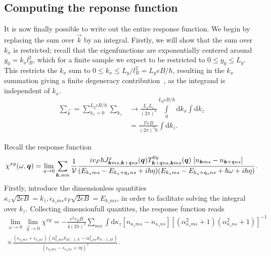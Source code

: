 \subsection{Computing the reponse function}
\label{sec:response_notilt}
It is now finally possible to write out the entire response function.
We begin by replacing the sum over \( \vec{k} \) by an integral.
Firstly, we will show that the sum over $k_x$ is restricted;
recall that the eigenfunctions are exponentially centered around $y_0 = k_x l_B^2$, which for a finite sample we expect to be restricted to $0 \leq y_0 \leq L_y$.
This restricts the $k_x$ sum to $0 \leq k_x \leq L_y / l_B^2 = L_ye B /\hbar $, resulting in the $k_x$ summation giving a finite degeneracy contribution~\cites[Ch.~1.4.1]{tongGaugeTheoryLecture}{linderIntermediateQuantumMechanics2017}, as the integrand is independent of \( k_x \).
\begin{align}
  \sum\limits_{\vec{k}}^{} = \sum\limits_{k_x = 0}^{L_y eB / \hbar } \sum\limits_{k_z}^{} &\to 
                                                                                            \frac{L_xL_z}{(2\pi )^2} \int\limits_0^{L_y e B /\hbar } \mathrm{d}k_x \int\mathrm{d}k_z \\
  &= \frac{\mathcal{V} e B}{(2 \pi)^2 \hbar } \int \mathrm{d}k_{z}.
\end{align}

Recall the response function
\begin{equation}
  \chi ^{xy} (\omega , \bm{q}) =
  \lim_{\eta \to 0}
  \sum\limits_{\bm{k}, mn}^{}
  \frac{1}{\mathcal{V}}
  \frac{
    i v_F \hbar J^x_{\bm{k} m s, \bm{k}+\mathfrak{q} n s}(\bm{q})
    T^{0y}_{\bm{k}+\mathfrak{q} ns, \bm{k}ms}(\bm{q})
    \;
    [n_{\bm{k} m s}- n_{\bm{k}+\mathfrak{q} ns }]
  }{
    (E_{k_z m s} - E_{k_z + \mathfrak{q}_z ns} + i \hbar  \eta )
    (E_{k_z m s} - E_{k_z + \mathfrak{q}_z ns} + \hbar \omega + i \hbar  \eta )
  }
  .
\end{equation}
Firstly, introduce the dimensionless quantities \( \kappa_z \sqrt{2 eB} = k_z, \epsilon_{k_z m s} v_F \sqrt{2 e B} = E_{k_z m s}  \), in order to facilitate solving the integral over \( k_z \).
Collecting dimensionfull quantites, the response function reads
\begin{multline}
  \label{eq:90}
\lim_{\omega \to 0} \lim_{\vec{q} \to 0} \chi^{xy} =
  -\frac{e^2 v_F B }{4 (2 \pi)^2}
  \sum\limits_{m n}^{}
  \int \mathrm{d} \kappa_z
  [n_{\kappa_z m s} - n_{\kappa_z n s}]
  [(\alpha_{\kappa_z m s}^2 + 1) (\alpha_{\kappa_z n s}^2 + 1)]^{-1}\\
  \times
  \frac{
    (\epsilon_{\kappa_z m s} + \epsilon_{\kappa_z n s})
    (\alpha_{\kappa_z m s}^2 \delta_{M-1, N} - \alpha_{\kappa_z n s}^2 \delta_{N-1, M})
  }{
    (\epsilon_{\kappa_z m s} - \epsilon_{\kappa_z n s} + i \eta)^2
  }.
\end{multline}

